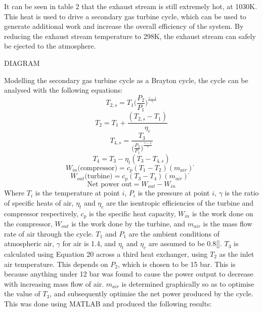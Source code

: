 It can be seen in table 2 that the exhaust stream is still extremely hot, at 1030K. This heat is used to drive a secondary gas turbine cycle, which can be used to generate additional work and increase the overall efficiency of the system. By reducing the exhaust stream temperature to 298K, the exhaust stream can safely be ejected to the atmosphere.

DIAGRAM

Modelling the secondary gas turbine cycle as a Brayton cycle, the cycle can be analysed with the following equations:
\begin{equation}
T_{2,s}= T_1 \Big (\frac{P_2}{P_1} \Big )^{\frac{\gamma-1}{\gamma}}					
\end{equation}
\begin{equation}
T_2= T_1+  \frac{(T_{2,s}- T_1)}{\eta_c} 					
\end{equation}
\begin{equation}
T_{4,s}=\frac{T_3}{\Big (\frac{P_2}{P_1} \Big )^{\frac{\gamma-1}{\gamma}}} 						
\end{equation}
\begin{equation}
T_4= T_3- \eta_t (T_3- T_{4,s})				
\end{equation}
\begin{equation}
W_{in} \text{(compressor)}= c_p (T_1- T_2)(m_{air} ) ̇				
\end{equation}
\begin{equation}
W_{out} \text{(turbine)}= c_p (T_3- T_4)(m_{air} ) ̇				
\end{equation}
\begin{equation}
\text {Net power out}=W_{out} - W_{in}		
\end{equation}
Where $T_i$ is the temperature at point $i$, $P_i$ is the pressure at point $i$, $\gamma$ is the ratio of specific heats of air, $\eta_t$ and $\eta_c$ are the isentropic efficiencies of the turbine and compressor respectively, $c_p$ is the specific heat capacity, $W_{in}$ is the work done on the compressor, $W_{out}$ is the work done by the turbine, and $m_{air}$ is the mass flow rate of air through the cycle. $T_1$ and $P_1$ are the ambient conditions of atmospheric air, $\gamma$ for air is 1.4, and $\eta_t$ and $\eta_c$ are assumed to be 0.8[]. $T_3$ is calculated using Equation 20 across a third heat exchanger, using $T_2$ as the inlet air temperature. This depends on $P_2$, which is chosen to be 15 bar. This is because anything under 12 bar was found to cause the power output to decrease with increasing mass flow of air. $m_{air}$ is determined graphically so as to optimise the value of $T_3$, and subsequently optimise the net power produced by the cycle. This was done using MATLAB and produced the following results:


